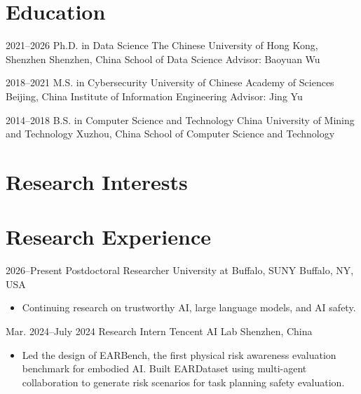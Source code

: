 \documentclass[11pt,a4paper,sans]{moderncv}
\begin{document}
\makecvtitle
\section{Education}
    \cventry
        {2021--2026} %
        {Ph.D. in Data Science} %
        {The Chinese University of Hong Kong, Shenzhen} %
        {Shenzhen, China} %
        {School of Data Science} %
        {Advisor: Baoyuan Wu}

    \cventry
        {2018--2021}
        {M.S. in Cybersecurity}
        {University of Chinese Academy of Sciences}
        {Beijing, China}
        {Institute of Information Engineering}
        {Advisor: Jing Yu}
        
    \cventry
        {2014--2018}
        {B.S. in Computer Science and Technology}
        {China University of Mining and Technology}
        {Xuzhou, China}
        {School of Computer Science and Technology}
        {}

\section{Research Interests}

\section{Research Experience}
    \cventry
        {2026--Present}
        {Postdoctoral Researcher}
        {University at Buffalo, SUNY}
        {Buffalo, NY, USA}
        {}
        {\begin{itemize}
        \item Continuing research on trustworthy AI, large language models, and AI safety.
        \end{itemize}}

    \cventry
        {Mar. 2024--July 2024}
        {Research Intern}
        {Tencent AI Lab}
        {Shenzhen, China}
        {}
        {\begin{itemize}
        \item Led the design of EARBench, the first physical risk awareness evaluation benchmark for embodied AI. Built EARDataset using multi-agent collaboration to generate risk scenarios for task planning safety evaluation.
        \end{itemize}}
\end{document}
